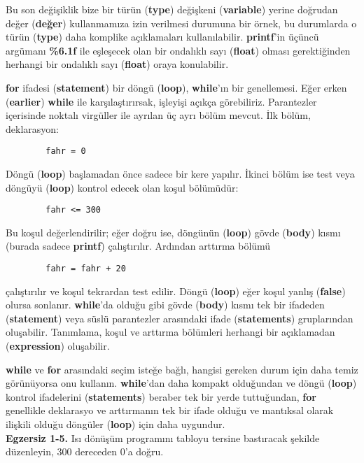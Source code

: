 \documentclass[a4paper,12pt,oneside]{book}
\begin{document}
\par Bu son değişiklik bize bir türün (\textbf{type}) değişkeni (\textbf{variable}) yerine doğrudan değer (\textbf{değer}) kullanmamıza izin verilmesi durumuna bir örnek, bu durumlarda o türün (\textbf{type}) daha komplike açıklamaları kullanılabilir. \textbf{printf}'in üçüncü argümanı \textbf{\%6.1f} ile eşleşecek olan bir ondalıklı sayı (\textbf{float}) olması gerektiğinden herhangi bir ondalıklı sayı (\textbf{float}) oraya konulabilir.
\par \textbf{for} ifadesi (\textbf{statement}) bir döngü (\textbf{loop}), \textbf{while}'ın bir genellemesi. Eğer erken (\textbf{earlier}) \textbf{while} ile karşılaştırırsak, işleyişi açıkça görebiliriz. Parantezler içerisinde noktalı virgüller ile ayrılan üç ayrı bölüm mevcut. İlk bölüm, deklarasyon:
\begin{lstlisting}
		fahr = 0
\end{lstlisting}
Döngü (\textbf{loop}) başlamadan önce sadece bir kere yapılır. İkinci bölüm ise test veya döngüyü (\textbf{loop}) kontrol edecek olan koşul bölümüdür:
\begin{lstlisting}
		fahr <= 300
\end{lstlisting}
Bu koşul değerlendirilir; eğer doğru ise, döngünün (\textbf{loop}) gövde (\textbf{body}) kısmı (burada sadece \textbf{printf}) çalıştırılır. Ardından arttırma bölümü
\begin{lstlisting}
		fahr = fahr + 20
\end{lstlisting}
çalıştırılır ve koşul tekrardan test edilir. Döngü (\textbf{loop}) eğer koşul yanlış (\textbf{false}) olursa sonlanır. \textbf{while}'da olduğu gibi gövde (\textbf{body}) kısmı tek bir ifadeden (\textbf{statement}) veya süslü parantezler arasındaki ifade (\textbf{statements}) gruplarından oluşabilir. Tanımlama, koşul ve arttırma bölümleri herhangi bir açıklamadan (\textbf{expression}) oluşabilir.
\par \textbf{while} ve \textbf{for} arasındaki seçim isteğe bağlı, hangisi gereken durum için daha temiz görünüyorsa onu kullanın. \textbf{while}'dan daha kompakt olduğundan ve döngü (\textbf{loop}) kontrol ifadelerini (\textbf{statements}) beraber tek bir yerde tuttuğundan, \textbf{for} genellikle deklarasyo ve arttırmanın tek bir ifade olduğu ve mantıksal olarak ilişkili olduğu döngüler (\textbf{loop}) için daha uygundur. \newline
\\ \noindent \textbf{Egzersiz 1-5.} Isı dönüşüm programını tabloyu tersine bastıracak şekilde düzenleyin, 300 dereceden 0'a doğru. \pagebreak
\end{document}
